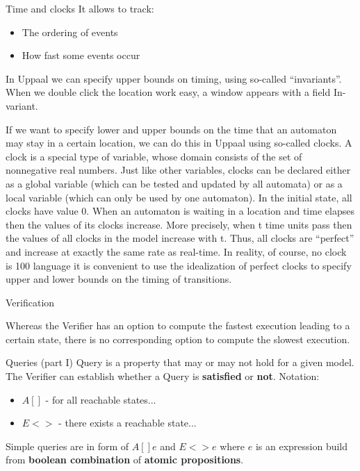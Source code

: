 \documentclass{beamer}
\begin{document}
\begin{frame}{Time and clocks}
	It allows to track:
	\begin{itemize}
		\item The ordering of events
		\item How fast some events occur
	\end{itemize}
	
	In Uppaal we can specify upper bounds on timing, using so-called “invariants”.
	When we double click the location work easy, a window appears with a field In-variant.
	
	If we want to specify lower and upper bounds on the time that an automaton may
	stay in a certain location, we can do this in Uppaal using so-called clocks. A clock
	is a special type of variable, whose domain consists of the set of nonnegative real
	numbers. Just like other variables, clocks can be declared either as a global variable
	(which can be tested and updated by all automata) or as a local variable (which can
	only be used by one automaton). In the initial state, all clocks have value 0. When
	an automaton is waiting in a location and time elapses then the values of its clocks
	increase. More precisely, when t time units pass then the values of all clocks in the
	model increase with t. Thus, all clocks are “perfect” and increase at exactly the same
	rate as real-time. In reality, of course, no clock is 100%
	language it is convenient to use the idealization of perfect clocks to specify upper
	and lower bounds on the timing of transitions.
\end{frame}

\begin{frame}{Verification}
	
	Whereas the Verifier has an option to compute the fastest execution leading to
	a certain state, there is no corresponding option to compute the slowest execution.
\end{frame}

\begin{frame}{Queries (part I)}
	Query is a property that may or may not hold for a given model. The Verifier can establish whether a Query is \textbf{satisfied} or \textbf{not}.\newline
	Notation:
	\begin{itemize}
		\item $A[]$ - for all reachable states...
		\item $E<>$ - there exists a reachable state...
	\end{itemize}
	Simple queries are in form of $A[] e$ and $E<> e$ where $e$ is an expression build from \textbf{boolean combination} of \textbf{atomic propositions}.
\end{frame}
\end{document}
